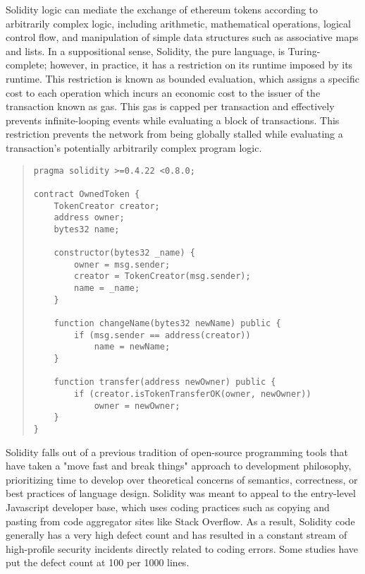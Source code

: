 
Solidity logic can mediate the exchange of ethereum tokens according to
arbitrarily complex logic, including arithmetic, mathematical operations,
logical control flow, and manipulation of simple data structures such as
associative maps and lists. In a suppositional sense, Solidity, the pure
language, is Turing-complete; however, in practice, it has a restriction on its
runtime imposed by its runtime. This restriction is known as bounded evaluation,
which assigns a specific cost to each operation which incurs an economic cost to
the issuer of the transaction known as gas. This gas is capped per transaction
and effectively prevents infinite-looping events while evaluating a block of
transactions. This restriction prevents the network from being globally stalled
while evaluating a transaction's potentially arbitrarily complex program logic.

\begin{quote}
\begin{verbatim}
pragma solidity >=0.4.22 <0.8.0;

contract OwnedToken {
    TokenCreator creator;
    address owner;
    bytes32 name;

    constructor(bytes32 _name) {
        owner = msg.sender;
        creator = TokenCreator(msg.sender);
        name = _name;
    }

    function changeName(bytes32 newName) public {
        if (msg.sender == address(creator))
            name = newName;
    }

    function transfer(address newOwner) public {
        if (creator.isTokenTransferOK(owner, newOwner))
            owner = newOwner;
    }
}
\end{verbatim}
\end{quote}


Solidity falls out of a previous tradition of open-source programming tools that
have taken a "move fast and break things" approach to development philosophy,
prioritizing time to develop over theoretical concerns of semantics,
correctness, or best practices of language design. Solidity was meant to appeal
to the entry-level Javascript developer base, which uses coding practices such
as copying and pasting from code aggregator sites like Stack Overflow. As a
result, Solidity code generally has a very high defect count and has resulted in
a constant stream of high-profile security incidents directly related to coding
errors. Some studies have put the defect count at 100 per 1000 lines.

